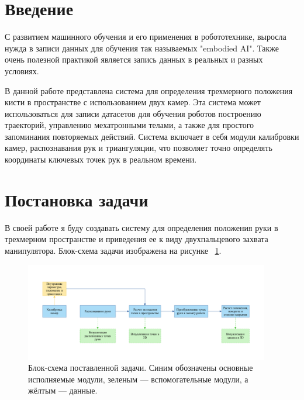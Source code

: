 \documentclass[12pt, a4paper]{article}
\begin{document}
\onehalfspacing



\section{Введение}
С развитием машинного обучения и его применения в робототехнике, выросла
нужда в записи данных для обучения так называемых "embodied AI". Также
очень полезной практикой является запись данных в реальных и разных
условиях.

В данной работе представлена система для определения трехмерного
положения кисти в пространстве с использованием двух камер. Эта система
может использоваться для записи датасетов для обучения роботов построению
траекторий, управлению мехатронными телами, а также для простого
запоминания повторяемых действий. Система включает в себя модули
калибровки камер, распознавания рук и триангуляции, что позволяет точно
определять координаты ключевых точек рук в реальном времени.

\section{Постановка задачи}
В своей работе я буду создавать систему для определения положения руки в
трехмерном пространстве и приведения ее к виду двухпальцевого захвата
манипулятора.
Блок-схема задачи изображена на рисунке ~\ref{fig:problem_block_scheme}. 
\begin{figure}[h!]
  \begin{center}
    \includegraphics[width=0.95\textwidth]{images/block-schemes/problem_scheme.png}
  \end{center}
  \caption{
    Блок-схема поставленной задачи. Синим обозначены основные
    исполняемые модули, зеленым --- вспомогательные модули, а жёлтым ---
    данные.
  }
\label{fig:problem_block_scheme}
\end{figure}
\end{document}
